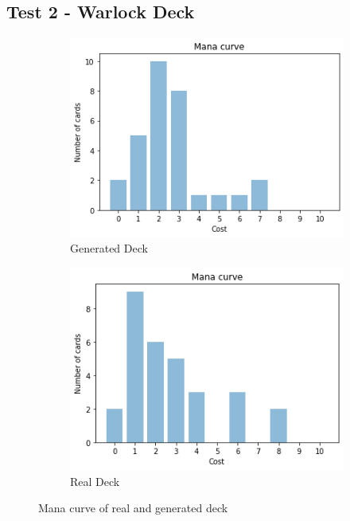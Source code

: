 \documentclass{report} %
\begin{document}
\subsection{Test 2 - Warlock Deck}
\begin{figure}[H]
\centering
\begin{subfigure}{.5\textwidth}
  \centering
  \includegraphics[width=.75\linewidth]{TestImages/WarlockDeckManaCurveFake}
  \caption{Generated Deck}
\end{subfigure}%
\begin{subfigure}{.5\textwidth}
  \centering
  \includegraphics[width=.75\linewidth]{TestImages/WarlockDeckManaCurveReal}
  \caption{Real Deck}
\end{subfigure}
\caption{Mana curve of real and generated deck}
\end{figure}
\end{document}

